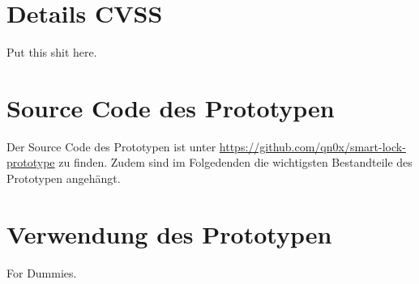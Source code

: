 \section{Details CVSS}
    Put this shit here.
    
\newpage
\section{Source Code des Prototypen}
    Der Source Code des Prototypen ist unter \sloppy\url{https://github.com/qn0x/smart-lock-prototype} zu finden. 
    Zudem sind im Folgedenden die wichtigsten Bestandteile des Prototypen angehängt.
    
\newpage
\section{Verwendung des Prototypen}
    For Dummies. 

